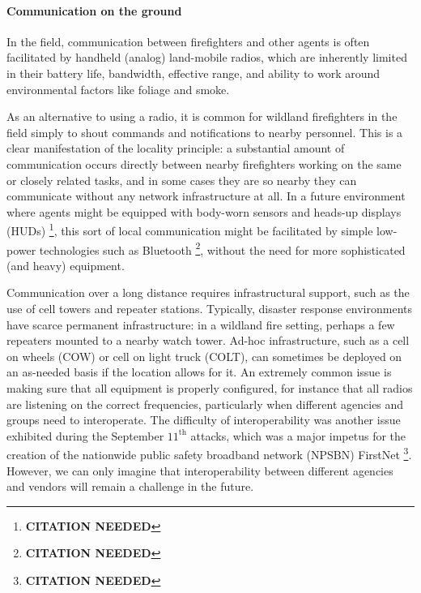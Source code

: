 \documentclass[]             %
{NASA}                       %
\theoremstyle{definition}
\newcommand{\citationneeded}{\footnote{\textbf{CITATION NEEDED}}}
\begin{document}

\paragraph{Communication on the ground}

In the field, communication between firefighters and other agents is
often facilitated by handheld (analog) land-mobile radios, which are
inherently limited in their battery life, bandwidth, effective range,
and ability to work around environmental factors like foliage and
smoke.

As an alternative to using a radio, it is common for wildland
firefighters in the field simply to shout commands and notifications
to nearby personnel. This is a clear manifestation of the locality
principle: a substantial amount of communication occurs directly
between nearby firefighters working on the same or closely related
tasks, and in some cases they are so nearby they can communicate
without any network infrastructure at all. In a future environment
where agents might be equipped with body-worn sensors and heads-up
displays (HUDs) \citationneeded, this sort of local communication
might be facilitated by simple low-power technologies such as
Bluetooth \citationneeded, without the need for more sophisticated
(and heavy) equipment.

Communication over a long distance requires infrastructural support,
such as the use of cell towers and repeater stations. Typically,
disaster response environments have scarce permanent infrastructure:
in a wildland fire setting, perhaps a few repeaters mounted to a
nearby watch tower. Ad-hoc infrastructure, such as a cell on wheels
(COW) or cell on light truck (COLT), can sometimes be deployed on an
as-needed basis if the location allows for it. An extremely common
issue is making sure that all equipment is properly configured, for
instance that all radios are listening on the correct frequencies,
particularly when different agencies and groups need to
interoperate. The difficulty of interoperability was another issue
exhibited during the September $11^\textrm{th}$ attacks, which was a
major impetus for the creation of the nationwide public safety
broadband network (NPSBN) FirstNet \citationneeded. However, we can
only imagine that interoperability between different agencies and
vendors will remain a challenge in the future.
\end{document}
